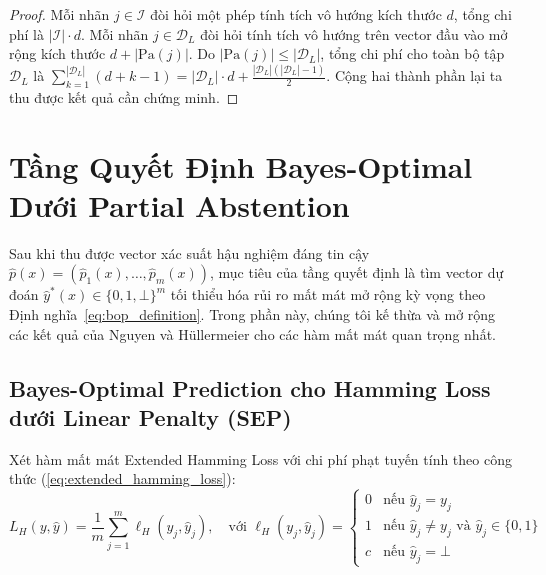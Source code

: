\documentclass[11pt,a4paper]{article}
\begin{document}
\begin{proof}
Mỗi nhãn $j \in \mathcal{I}$ đòi hỏi một phép tính tích vô hướng kích thước $d$, tổng chi phí là $|\mathcal{I}| \cdot d$. Mỗi nhãn $j \in \mathcal{D}_L$ đòi hỏi tính tích vô hướng trên vector đầu vào mở rộng kích thước $d + |\mathrm{Pa}(j)|$. Do $|\mathrm{Pa}(j)| \le |\mathcal{D}_L|$, tổng chi phí cho toàn bộ tập $\mathcal{D}_L$ là $\sum_{k=1}^{|\mathcal{D}_L|} (d + k - 1) = |\mathcal{D}_L| \cdot d + \frac{|\mathcal{D}_L|(|\mathcal{D}_L|-1)}{2}$. Cộng hai thành phần lại ta thu được kết quả cần chứng minh.
\end{proof}

\newpage
\section{Tầng Quyết Định Bayes-Optimal Dưới Partial Abstention}
\label{sec:bayes_optimal_derivations}

Sau khi thu được vector xác suất hậu nghiệm đáng tin cậy $\hat{p}(x) = (\hat{p}_1(x), \dots, \hat{p}_m(x))$, mục tiêu của tầng quyết định là tìm vector dự đoán $\hat{y}^*(x) \in \{0, 1, \bot\}^m$ tối thiểu hóa rủi ro mất mát mở rộng kỳ vọng theo Định nghĩa~\ref{eq:bop_definition}. Trong phần này, chúng tôi kế thừa và mở rộng các kết quả của Nguyen và H\"ullermeier \cite{nguyen2021multilabel} cho các hàm mất mát quan trọng nhất.

\subsection{Bayes-Optimal Prediction cho Hamming Loss dưới Linear Penalty (SEP)}
Xét hàm mất mát Extended Hamming Loss với chi phí phạt tuyến tính theo công thức (\ref{eq:extended_hamming_loss}):
\begin{equation}
L_H(y, \hat{y}) = \frac{1}{m} \sum_{j=1}^m \ell_H(y_j, \hat{y}_j), \quad \text{với } \ell_H(y_j, \hat{y}_j) = 
\begin{cases}
0 & \text{nếu } \hat{y}_j = y_j \\
1 & \text{nếu } \hat{y}_j \neq y_j \text{ và } \hat{y}_j \in \{0, 1\} \\
c & \text{nếu } \hat{y}_j = \bot
\end{cases}
\end{equation}
\end{document}

